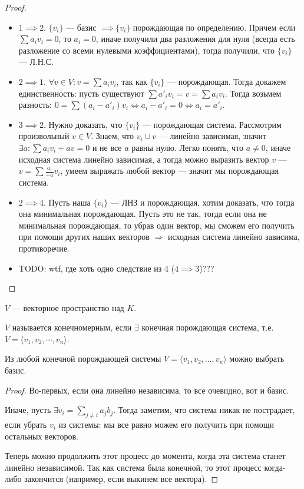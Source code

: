 \begin{proof}
    \slashn
     \begin{itemize}
	     \item $1 \implies 2$.  $\{v_i\}$ --- базис  $\implies \{v_i\}$ порождающая по определению. Причем если $\sum a_i v_i = 0$, то $a_i = 0$, иначе получили два разложения для нуля (всегда есть разложение со всеми нулевыми коэффициентами), тогда получили, что $\{v_i\}$ --- Л.Н.С.
         \item $2 \implies 1$.  $\forall v \in V\!: v = \sum a_i v_i$, так как $\{v_i\}$ --- порождающая. Тогда докажем единственность: пусть существуют $\sum a'_i v_i = v = \sum a_i v_i$. Тогда возьмем разность: $0 = \sum (a_i - a'_i) v_i \iff a_i - a'_i = 0 \iff a_i = a'_i$.
	 \item  $3 \implies 2$. Нужно доказать, что $\{v_i\}$ --- порождающая система. Рассмотрим произвольный $v \in V$. Знаем, что ${v_i} \cup {v}$ --- линейно зависимая, значит $\exists a: \sum a_i v_i + av = 0$ и не все $a$ равны нулю. Легко понять, что $a\neq 0$, иначе исходная система линейно зависимая, а тогда можно выразить вектор $v$ --- $v = \sum\frac{a_i}{-a}v_i$, умеем выражать любой вектор --- значит мы порождающая система.
         \item $2 \implies 4$. Пусть наша  $\{v_i\}$ --- ЛНЗ и порождающая, хотим доказать, что тогда она минимальная порождающая. Пусть это не так, тогда если она не минимальная порождающая, то убрав один вектор, мы сможем его получить при помощи других наших векторов  $\Rightarrow$ исходная система линейно зависима, противоречие.
         \item TODO: wtf, где хоть одно следствие из 4 ($4 \implies 3$)???
    \end{itemize}
\end{proof}

\begin{definition}
    $V$ --- векторное пространство над  $K$.

    $V$ называется конечномерным, если  $\exists$ конечная порождающая система, т.е. $V = \langle v_1, v_2, \cdots, v_n \rangle$.
\end{definition}
\begin{lemma}
    Из любой конечной порождающей системы $V = \langle v_1, v_2, \ldots, v_n \rangle$ можно выбрать базис.
\end{lemma}
\begin{proof}
    Во-первых, если она линейно независима, то все очевидно, вот и базис.

    Иначе, пусть $\exists v_i = \sum\limits_{j \neq i}a_j b_j$. Тогда заметим, что система никак не пострадает, если убрать $v_i$ из системы: мы все равно можем его получить при помощи остальных векторов. 

    Теперь можно продолжить этот процесс до момента, когда эта система станет линейно независимой. Так как система была конечной, то этот процесс когда-либо закончится (например, если выкинем все вектора).
\end{proof}

